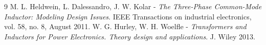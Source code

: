 \documentclass[11pt,a4paper]{scrartcl}
\begin{document}
\begin{onehalfspace}
	\newpage
	\begin{thebibliography}{9}
		M. L. Heldwein, L. Dalessandro, J. W. Kolar - \emph{The Three-Phase Common-Mode Inductor: Modeling Design Issues}. IEEE Transactions on industrial electronics, vol. 58, no. 8, August 2011.
		W. G. Hurley, W. H. Woelfle - \emph{Transformers and Inductors for Power Electronics. Theory design and applications}. J. Wiley 2013.
	\end{thebibliography}
	
\end{onehalfspace}
\end{document}
